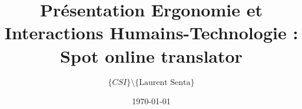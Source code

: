 \documentclass{beamer}
\author {$\{CSI\} \setminus \{\text{Laurent Senta}\}$}
\date\today
\title[Ergonomie: Spot online ]{Présentation Ergonomie et Interactions Humains-Technologie : \og Spot online translator\fg}
\institute{Epita - CSI}
\begin{document}
\begin{frame}
  \maketitle
\end{frame}










\end{document}
